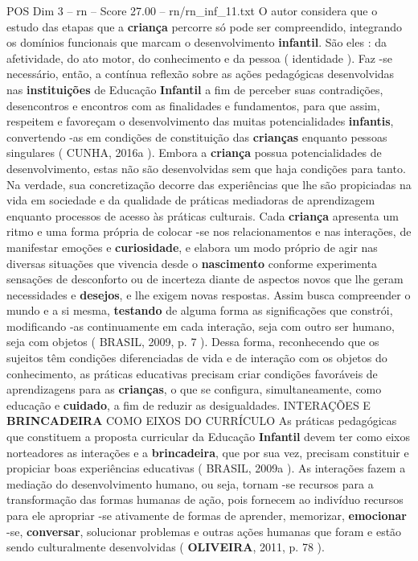 \begin{textsample}{POS Dim 3 – rn – Score 27.00 – rn/rn\_inf\_11.txt}
O autor considera que o estudo das etapas que a \textbf{criança} percorre só pode ser compreendido, integrando os domínios funcionais que marcam o desenvolvimento \textbf{infantil}.
São eles : da afetividade, do ato motor, do conhecimento e da pessoa ( identidade ).
Faz -se necessário, então, a contínua reflexão sobre as ações pedagógicas desenvolvidas nas \textbf{instituições} de Educação \textbf{Infantil} a fim de perceber suas contradições, desencontros e encontros com as finalidades e fundamentos, para que assim, respeitem e favoreçam o desenvolvimento das muitas potencialidades \textbf{infantis}, convertendo -as em condições de constituição das \textbf{crianças} enquanto pessoas singulares ( CUNHA, 2016a ).
Embora a \textbf{criança} possua potencialidades de desenvolvimento, estas não são desenvolvidas sem que haja condições para tanto.
Na verdade, sua concretização decorre das experiências que lhe são propiciadas na vida em sociedade e da qualidade de práticas mediadoras de aprendizagem enquanto processos de acesso às práticas culturais.
Cada \textbf{criança} apresenta um ritmo e uma forma própria de colocar -se nos relacionamentos e nas interações, de manifestar emoções e \textbf{curiosidade}, e elabora um modo próprio de agir nas diversas situações que vivencia desde o \textbf{nascimento} conforme experimenta sensações de desconforto ou de incerteza diante de aspectos novos que lhe geram necessidades e \textbf{desejos}, e lhe exigem novas respostas.
Assim busca compreender o mundo e a si mesma, \textbf{testando} de alguma forma as significações que constrói, modificando -as continuamente em cada interação, seja com outro ser humano, seja com objetos ( BRASIL, 2009, p. 7 ).
Dessa forma, reconhecendo que os sujeitos têm condições diferenciadas de vida e de interação com os objetos do conhecimento, as práticas educativas precisam criar condições favoráveis de aprendizagens para as \textbf{crianças}, o que se configura, simultaneamente, como educação e \textbf{cuidado}, a fim de reduzir as desigualdades.
INTERAÇÕES E \textbf{BRINCADEIRA} COMO EIXOS DO CURRÍCULO As práticas pedagógicas que constituem a proposta curricular da Educação \textbf{Infantil} devem ter como eixos norteadores as interações e a \textbf{brincadeira}, que por sua vez, precisam constituir e propiciar boas experiências educativas ( BRASIL, 2009a ).
As interações fazem a mediação do desenvolvimento humano, ou seja, tornam -se recursos para a transformação das formas humanas de ação, pois fornecem ao indivíduo recursos para ele apropriar -se ativamente de formas de aprender, memorizar, \textbf{emocionar} -se, \textbf{conversar}, solucionar problemas e outras ações humanas que foram e estão sendo culturalmente desenvolvidas ( \textbf{OLIVEIRA}, 2011, p. 78 ).

\end{textsample}
